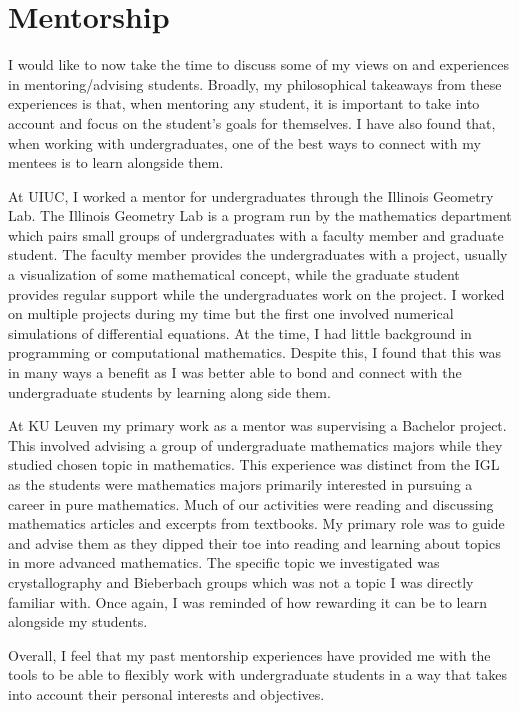 \documentclass{article}
\begin{document}
\section*{Mentorship}
I would like to now take the time to discuss some of my views on and experiences in mentoring/advising students. Broadly, my philosophical takeaways from these experiences is that, when mentoring any student, it is important to take into account and focus on the student's goals for themselves. I have also found that, when working with undergraduates, one of the best ways to connect with my mentees is to learn alongside them.

At UIUC, I worked a mentor for undergraduates through the Illinois Geometry Lab. The Illinois Geometry Lab is a program run by the mathematics department which pairs small groups of undergraduates with a faculty member and graduate student. The faculty member provides the undergraduates with a project, usually a visualization of some mathematical concept, while the graduate student provides regular support while the undergraduates work on the project. I worked on multiple projects during my time but the first one involved numerical simulations of differential equations. At the time, I had little background in programming or computational mathematics. Despite this, I found that this was in many ways a benefit as I was better able to bond and connect with the undergraduate students by learning along side them. 

At KU Leuven my primary work as a mentor was supervising a Bachelor project. This involved advising a group of undergraduate mathematics majors while they studied chosen topic in mathematics. This experience was distinct from the IGL as the students were mathematics majors primarily interested in pursuing a career in pure mathematics. Much of our activities were reading and discussing mathematics articles and excerpts from textbooks. My primary role was to guide and advise them as they dipped their toe into reading and learning about topics in more advanced mathematics. The specific topic we investigated was crystallography and Bieberbach groups which was not a topic I was directly familiar with. Once again, I was reminded of how rewarding it can be to learn alongside my students.

Overall, I feel that my past mentorship experiences have provided me with the tools to be able to flexibly work with undergraduate students in a way that takes into account their personal interests and objectives.
\end{document}

